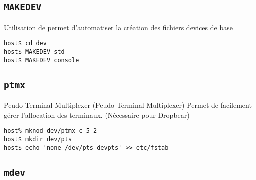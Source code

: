\subsection{\texttt{MAKEDEV}}

\begin{frame}[fragile=singleslide]{Utilisation de }
   permet d'automatiser  la création des fichiers devices
  de base
  \begin{lstlisting}
host$ cd dev
host$ MAKEDEV std
host$ MAKEDEV console
  \end{lstlisting}
\end{frame}

\subsection{\texttt{ptmx}}

\begin{frame}[fragile=singleslide]{Peudo Terminal Multiplexer}
   (Peudo  Terminal Multiplexer) Permet  de facilement gérer
  l'allocation des terminaux. (Nécessaire pour Dropbear)
  \begin{lstlisting}
host% mknod dev/ptmx c 5 2
host$ mkdir dev/pts
host$ echo 'none /dev/pts devpts' >> etc/fstab
  \end{lstlisting}
\end{frame}

\subsection{\texttt{mdev}}

